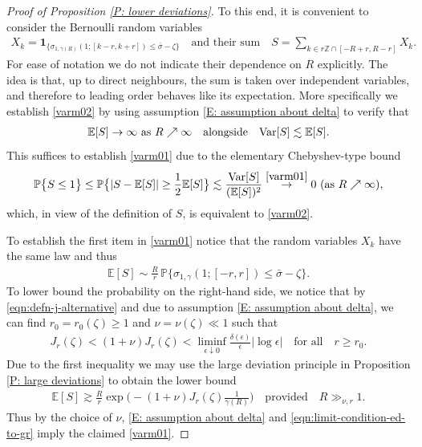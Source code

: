 \documentclass[12pt]{amsart}
\begin{document}
\begin{proof}[Proof of Proposition \ref{P: lower deviations}]
	To this end, it is convenient to consider the Bernoulli random variables
	\begin{align*}
		X_{ k } = \boldsymbol{1}_{ \{ \sigma_{ 1 , \gamma(R) } ( 1 ; [ k - r , k + r ] ) \leq \bar\sigma - \zeta \} }
		\quad \text{and their sum} \quad
		S = \sum_{ k \in r \mathbb{Z} \cap [ - R + r , R - r  ] } X_k .
	\end{align*}
	For ease of notation we do not indicate their dependence on $ R $ explicitly. The idea is that, up to direct neighbours, the sum is taken over independent variables, and therefore to leading order behaves like its expectation. More specifically we establish \eqref{varm02} by using assumption \eqref{E: assumption about delta} to verify that
	\begin{align}\label{varm01}
		\mathbb{E} [ S ] \rightarrow \infty ~ \text{as} ~ R \nearrow \infty
		\quad \text{alongside} \quad
		{ \rm Var } [ S ] \lesssim \mathbb{E} [ S ].
	\end{align}
	This suffices to establish \eqref{varm01} due to the elementary Chebyshev-type bound
	\begin{align*}
		\mathbb{P} \big\{ S \leq 1 \big\} 
		\leq \mathbb{P} \big\{  | S - \mathbb{E} [ S ] | \geq \frac{ 1 }{ 2 } \mathbb{E} [ S ] \big\} 
		\lesssim \frac{ { \rm Var } [ S ] }{ ( \mathbb{E} [ S ] )^2 }
		\stackrel{ \eqref{varm01} }{ \rightarrow } 0 
		~ ( \text{as} ~ R \nearrow \infty ) ,
	\end{align*}
which, in view of the definition of $ S $, is equivalent to \eqref{varm02}.
        
To establish the first item in \eqref{varm01} notice that the random variables $ X_k $ have the same law and thus
	\begin{align*}
		\mathbb{E} [ S ]
		\sim \frac{ R }{ r } \, \mathbb{P} \big\{ \sigma_{ 1 , \gamma } ( 1 ; [ - r , r ] ) \leq \bar\sigma - \zeta \big\}   .
	\end{align*}
	To lower bound the probability on the right-hand side, we notice that by \eqref{eqn:defn-j-alternative} and due to assumption \eqref{E: assumption about delta}, we can find $ r_0 = r_0 ( \zeta ) \geq 1 $ and $ \nu = \nu ( \zeta ) \ll 1 $ such that
	\begin{align*}
		J_r ( \zeta ) 
		< ( 1 + \nu )  J_r ( \zeta ) < \liminf_{ \epsilon \downarrow 0} \frac{ \delta(\epsilon) }{ \epsilon } | \log \epsilon |
		\quad \text{for all} \quad
		r \geq r_0 .
	\end{align*}
	Due to the first inequality we may use the large deviation principle in Proposition \ref{P: large deviations} to obtain the lower bound
	\begin{align*}
		\mathbb{E} [ S ] \gtrsim \frac{ R }{ r } \exp \Big( - ( 1 + \nu )  J_{ r } ( \zeta ) \frac{ 1 }{ \gamma(R) } \Big) 
		\quad \text{provided} \quad
		R \gg_{ \nu, r } 1 .
	\end{align*}
	Thus by the choice of $ \nu $, \eqref{E: assumption about delta} and \eqref{eqn:limit-condition-ed-to-gr} imply the claimed \eqref{varm01}.
	

\end{proof}
\end{document}
